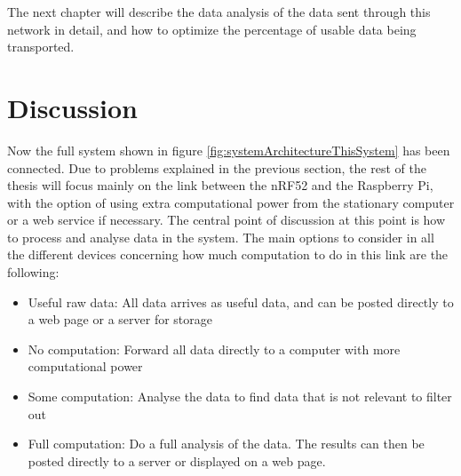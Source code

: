 
\noindent The next chapter will describe the data analysis of the data sent through this network in detail, and how to optimize the percentage of usable data being transported.  

\newpage

\section{Discussion}

\noindent Now the full system shown in figure \ref{fig:systemArchitectureThisSystem} has been connected. Due to problems explained in the previous section, the rest of the thesis will focus mainly on the link between the \gls{nRF52} and the \gls{Raspberry Pi}, with the option of using extra computational power from the stationary computer or a web service if necessary. The central point of discussion at this point is how to process and analyse data in the system. The main options to consider in all the different devices concerning how much computation to do in this link are the following: 

\begin{itemize}
  \item Useful raw data: All data arrives as useful data, and can be posted directly to a web page or a server for storage
  \item No computation: Forward all data directly to a computer with more computational power
  \item Some computation: Analyse the data to find data that is not relevant to filter out
  \item Full computation: Do a full analysis of the data. The results can then be posted directly to a server or displayed on a web page. 
\end{itemize}

